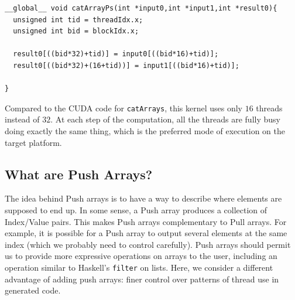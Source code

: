 \documentclass[]{sigplanconf}
\begin{document}
\begin{codesize}
\begin{verbatim}
__global__ void catArrayPs(int *input0,int *input1,int *result0){
  unsigned int tid = threadIdx.x;
  unsigned int bid = blockIdx.x;
  
  result0[((bid*32)+tid)] = input0[((bid*16)+tid)];
  result0[((bid*32)+(16+tid))] = input1[((bid*16)+tid)];
  
}
\end{verbatim}
\end{codesize}

\noindent
Compared to the CUDA code for {\tt catArrays}, this kernel 
uses only $16$ threads instead of $32$. At each step of the computation, all 
the threads are fully busy doing exactly the same thing, which is the preferred 
mode of execution on the target platform. 
 







\subsection {What are Push Arrays?} 

The idea behind Push arrays is to have a way to describe where 
elements are supposed to end up. In some sense, a Push array produces 
a collection of Index/Value pairs. %
This makes Push arrays complementary to Pull arrays. For example, it 
is possible for a Push array to output several elements at the same index 
(which we probably need to control carefully). Push arrays should permit 
us to provide more expressive operations on arrays to the user, including 
an operation similar to Haskell's {\tt filter} on lists. Here, we consider 
a different advantage of adding push arrays: finer control over patterns of 
thread use in generated code.
\end{document}
